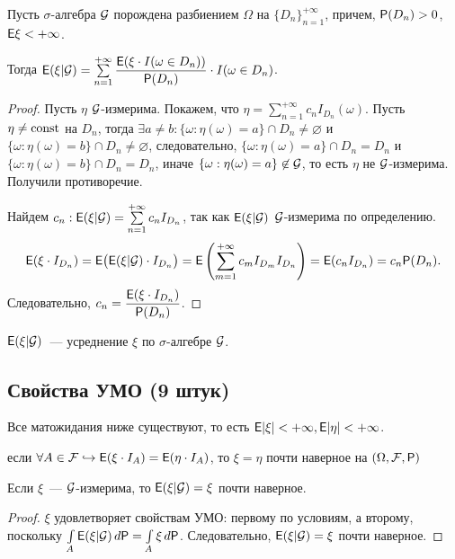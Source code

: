 \begin{theorem}
	Пусть $\sigma$-алгебра $\G$ порождена разбиением $\Omega$ на $\{ D_n \}_{n = 1}^{+\infty}$, причем, $\P(D_n) > 0$, $\E \xi < +\infty$.
	
	Тогда $\E(\xi | \G ) = \sum\limits_{n=1}^{+\infty} \dfrac{\E ( \xi \cdot I(\omega \in D_n) )}{\P(D_n)} \cdot I(\omega \in D_n) $.
	\begin{proof}
		Пусть $\eta$ $\G$-измерима. Покажем, что $\eta = \sum\limits_{n=1}^{+\infty} c_n I_{D_n}(\omega)$. Пусть $\eta \not=\const$ на $D_n$, тогда $\exists a \not= b: \{\omega: \eta(\omega) = a \} \cap D_n \not= \varnothing$ и $\{\omega: \eta(\omega) = b \} \cap D_n \not= \varnothing$, следовательно, $\{\omega: \eta(\omega) = a \} \cap D_n = D_n$ и $\{\omega: \eta(\omega) = b \} \cap D_n = D_n$, иначе $\{\omega: \eta(\omega) = a \} \not\in \G$, то есть $\eta$ не $\G$-измерима. Получили противоречие.
		
		Найдем $c_n: \E( \xi | \G) = \sum\limits_{n=1}^{+\infty} c_n I_{D_n}$, так как $\E(\xi | \G)$ $\G$-измерима по определению. 
		\begin{equation*}
			\E (\xi \cdot I_{D_n} ) = \E \big( \E( \xi | \G ) \cdot I_{D_n} \big) = \E \left( \sum\limits_{m=1}^{+\infty} c_m I_{D_m} I_{D_n} \right) = \E( c_n I_{D_n} ) = c_n \P(D_n).
		\end{equation*}
		Следовательно, $c_n = \dfrac{\E(\xi \cdot I_{D_n} )}{\P(D_n)}$.
	\end{proof}
\end{theorem}

\begin{statement}
$\E(\xi|\G )$~--- усреднение $\xi$ по $\sigma$-алгебре $\G$.
\end{statement}

\subsection{Свойства УМО (9 штук)}
Все матожидания ниже существуют, то есть $\E|\xi| <+\infty, \E|\eta| <+\infty$.

\setcounter{property}{0}
 если $\forall A \in \F \hookrightarrow \E(\xi \cdot I_A) = \E(\eta \cdot I_A)$, то $\xi = \eta$ почти наверное на $(\Omega, \F, \P)$

\begin{property}
	Если $\xi$~--- $\G$-измерима, то $\E(\xi | \G) = \xi$ почти наверное. 
	\begin{proof}
		$\xi$ удовлетворяет свойствам УМО: первому по условиям, а второму, поскольку $\int\limits_A \E(\xi|\G) \, d\P = \int\limits_A \xi \, d\P$. Следовательно, $\E(\xi | \G) = \xi$ почти наверное.  
	\end{proof}
\end{property}

